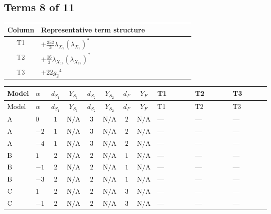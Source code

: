 \documentclass[8pt]{article}
\begin{document}
\begin{landscape}
\subsection*{Terms 8 of 11}
\begin{center}
\begin{tabular}{@{}c >{\raggedright\arraybackslash}p{0.82\linewidth}@{}}
\toprule
Column & Representative term structure \\
\midrule
T1 & \(\displaystyle +\frac{352}{3} {\lambda_{X_{9}}} \left({\lambda_{X_{9}}}\right)^{*}\) \\
\midrule
T2 & \(\displaystyle +\frac{16}{3} {\lambda_{X_{18}}} \left({\lambda_{X_{18}}}\right)^{*}\) \\
\midrule
T3 & \(\displaystyle +22 {g_2}^4\) \\
\midrule
\bottomrule
\end{tabular}
\end{center}
\smallskip
\tiny
\begin{longtable}{@{}llcccccc >{\raggedright\arraybackslash}p{0.21\linewidth} >{\raggedright\arraybackslash}p{0.21\linewidth} >{\raggedright\arraybackslash}p{0.21\linewidth}@{}}
\toprule
Model & $\alpha$ & $d_{S_1}$ & $Y_{S_1}$ & $d_{S_2}$ & $Y_{S_2}$ & $d_F$ & $Y_F$ & T1 & T2 & T3 \\
\midrule
\endfirsthead
\toprule
Model & $\alpha$ & $d_{S_1}$ & $Y_{S_1}$ & $d_{S_2}$ & $Y_{S_2}$ & $d_F$ & $Y_F$ & T1 & T2 & T3 \\
\midrule
\endhead
A & $0$ & $1$ & $\text{N/A}$ & $3$ & $\text{N/A}$ & $2$ & $\text{N/A}$ & --- & --- & --- \\
\midrule
A & $-2$ & $1$ & $\text{N/A}$ & $3$ & $\text{N/A}$ & $2$ & $\text{N/A}$ & --- & --- & --- \\
\midrule
A & $-4$ & $1$ & $\text{N/A}$ & $3$ & $\text{N/A}$ & $2$ & $\text{N/A}$ & --- & --- & --- \\
\midrule
B & $1$ & $2$ & $\text{N/A}$ & $2$ & $\text{N/A}$ & $1$ & $\text{N/A}$ & --- & --- & --- \\
\midrule
B & $-1$ & $2$ & $\text{N/A}$ & $2$ & $\text{N/A}$ & $1$ & $\text{N/A}$ & --- & --- & --- \\
\midrule
B & $-3$ & $2$ & $\text{N/A}$ & $2$ & $\text{N/A}$ & $1$ & $\text{N/A}$ & --- & --- & --- \\
\midrule
C & $1$ & $2$ & $\text{N/A}$ & $2$ & $\text{N/A}$ & $3$ & $\text{N/A}$ & --- & --- & --- \\
\midrule
C & $-1$ & $2$ & $\text{N/A}$ & $2$ & $\text{N/A}$ & $3$ & $\text{N/A}$ & --- & --- & --- \\

\end{longtable}
\end{landscape}
\end{document}
